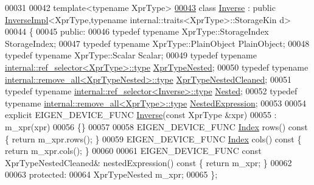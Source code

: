 \begin{DoxyCode}
00031 
00042 \textcolor{keyword}{template}<\textcolor{keyword}{typename} XprType>
\hyperlink{class_eigen_1_1_inverse}{00043} \textcolor{keyword}{class }\hyperlink{class_eigen_1_1_inverse}{Inverse} : \textcolor{keyword}{public} \hyperlink{class_eigen_1_1_inverse_impl}{InverseImpl}<XprType,typename internal::traits<XprType>::StorageKin
      d>
00044 \{
00045 \textcolor{keyword}{public}:
00046   \textcolor{keyword}{typedef} \textcolor{keyword}{typename} XprType::StorageIndex StorageIndex;
00047   \textcolor{keyword}{typedef} \textcolor{keyword}{typename} XprType::PlainObject                       PlainObject;
00048   \textcolor{keyword}{typedef} \textcolor{keyword}{typename} XprType::Scalar                            Scalar;
00049   \textcolor{keyword}{typedef} \textcolor{keyword}{typename} \hyperlink{class_eigen_1_1internal_1_1_tensor_lazy_evaluator_writable}{internal::ref\_selector<XprType>::type}      
      \hyperlink{class_eigen_1_1internal_1_1_tensor_lazy_evaluator_writable}{XprTypeNested};
00050   \textcolor{keyword}{typedef} \textcolor{keyword}{typename} \hyperlink{group___sparse_core___module}{internal::remove\_all<XprTypeNested>::type}  
      \hyperlink{group___sparse_core___module}{XprTypeNestedCleaned};
00051   \textcolor{keyword}{typedef} \textcolor{keyword}{typename} \hyperlink{class_eigen_1_1internal_1_1_tensor_lazy_evaluator_writable}{internal::ref\_selector<Inverse>::type} 
      \hyperlink{class_eigen_1_1internal_1_1_tensor_lazy_evaluator_writable}{Nested};
00052   \textcolor{keyword}{typedef} \textcolor{keyword}{typename} \hyperlink{group___sparse_core___module}{internal::remove\_all<XprType>::type} 
      \hyperlink{group___sparse_core___module}{NestedExpression};
00053   
00054   \textcolor{keyword}{explicit} EIGEN\_DEVICE\_FUNC \hyperlink{class_eigen_1_1_inverse}{Inverse}(\textcolor{keyword}{const} XprType &xpr)
00055     : m\_xpr(xpr)
00056   \{\}
00057 
00058   EIGEN\_DEVICE\_FUNC \hyperlink{namespace_eigen_a62e77e0933482dafde8fe197d9a2cfde}{Index} rows()\textcolor{keyword}{ const }\{ \textcolor{keywordflow}{return} m\_xpr.rows(); \}
00059   EIGEN\_DEVICE\_FUNC \hyperlink{namespace_eigen_a62e77e0933482dafde8fe197d9a2cfde}{Index} cols()\textcolor{keyword}{ const }\{ \textcolor{keywordflow}{return} m\_xpr.cols(); \}
00060 
00061   EIGEN\_DEVICE\_FUNC \textcolor{keyword}{const} XprTypeNestedCleaned& nestedExpression()\textcolor{keyword}{ const }\{ \textcolor{keywordflow}{return} m\_xpr; \}
00062 
00063 \textcolor{keyword}{protected}:
00064   XprTypeNested m\_xpr;
00065 \};

\end{DoxyCode}
